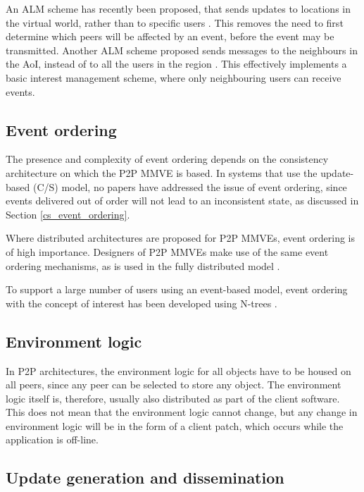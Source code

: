 An ALM scheme has recently been proposed, that sends updates to locations in the virtual world, rather than to specific users \cite{Ghaffari_Delaunay_churn_mobility}. This removes the need to first determine which peers will be affected by an event, before the event may be transmitted. Another ALM scheme proposed sends messages to the neighbours in the AoI, instead of to all the users in the region \cite{Seeger_area_based_gossip_multicast}. This effectively implements a basic interest management scheme, where only neighbouring users can receive events.

\subsection{Event ordering}

The presence and complexity of event ordering depends on the consistency architecture on which the P2P MMVE is based. In systems that use the update-based (C/S) model, no papers have addressed the issue of event ordering, since events delivered out of order will not lead to an inconsistent state, as discussed in Section \ref{cs_event_ordering}.

Where distributed architectures are proposed for P2P MMVEs, event ordering is of high importance. Designers of P2P MMVEs make use of the same event ordering mechanisms, as is used in the fully distributed model \cite{hybrid_storage1}.

To support a large number of users using an event-based model, event ordering with the concept of interest has been developed using N-trees \cite{GauthierDickey_ntrees}.

\subsection{Environment logic}

In P2P architectures, the environment logic for all objects have to be housed on all peers, since any peer can be selected to store any object. The environment logic itself is, therefore, usually also distributed as part of the client software. This does not mean that the environment logic cannot change, but any change in environment logic will be in the form of a client patch, which occurs while the application is off-line.

\subsection{Update generation and dissemination}

